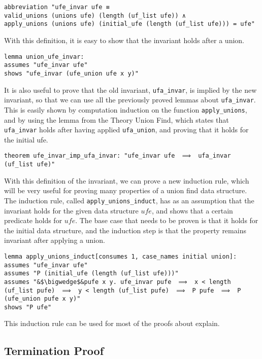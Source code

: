 \begin{lstlisting}
abbreviation "ufe_invar ufe ≡ 
valid_unions (unions ufe) (length (uf_list ufe)) ∧
apply_unions (unions ufe) (initial_ufe (length (uf_list ufe))) = ufe"
\end{lstlisting}

With this definition, it is easy to show that the invariant holds after a union. 

\begin{lstlisting}
lemma union_ufe_invar:
assumes "ufe_invar ufe"
shows "ufe_invar (ufe_union ufe x y)"
\end{lstlisting}

It is also useful to prove that the old invariant, \lstinline{ufa_invar}, is implied by the new invariant, so that we can use all the previously proved lemmas about \lstinline{ufa_invar}. This is easily shown by computation induction on the function \lstinline{apply_unions}, and by using the lemma from the Theory Union Find\cite{Sep}, which states that \lstinline{ufa_invar} holds after having applied \lstinline{ufa_union}, and proving that it holds for the initial ufe.

\begin{lstlisting}
theorem ufe_invar_imp_ufa_invar: "ufe_invar ufe  ⟹  ufa_invar (uf_list ufe)"
\end{lstlisting}

With this definition of the invariant, we can prove a new induction rule, which will be very useful for proving many properties of a union find data structure. The induction rule, called \lstinline{apply_unions_induct}, has as an assumption that the invariant holds for the given data structure $ufe$, and shows that a certain predicate holds for $ufe$. The base case that needs to be proven is that it holds for the initial data structure, and the induction step is that the property remains invariant after applying a union. 

\begin{lstlisting}
lemma apply_unions_induct[consumes 1, case_names initial union]:
assumes "ufe_invar ufe"
assumes "P (initial_ufe (length (uf_list ufe)))"
assumes "&$\bigwedge$&pufe x y. ufe_invar pufe  ⟹  x < length (uf_list pufe)  ⟹  y < length (uf_list pufe)  ⟹  P pufe  ⟹  P (ufe_union pufe x y)"
shows "P ufe"
\end{lstlisting}

This induction rule can be used for most of the proofs about explain.

\subsection{Termination Proof}
\label{subsection:termination}

